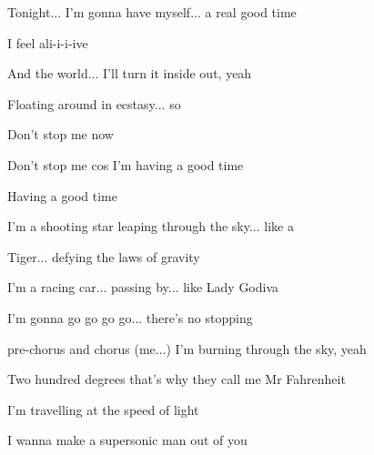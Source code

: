 \begin{song}



\large

\begin{chordbox}
\par
{}\par
{}\par
{}\par
{}\par
{}\par
{}\par
\end{chordbox}

\large

\bigskip

Tonight... I’m gonna have myself... a real good time \par
I feel ali-i-i-ive \par
And the world... I’ll turn it inside out, yeah \par
{}Floating around in ecstasy... so \par
{}Don’t stop me now \par
{}Don’t stop me cos I’m having a good time \par
{}Having a good time \par

\bigskip

I’m a shooting star leaping through the sky... like a \par
Tiger... defying the laws of gravity \par
I’m a racing car... passing by... like Lady Godiva \par
I’m gonna go go go go... there’s no stopping \par

\bigskip

\begin{chorusbox}{pre-chorus and chorus}
(me...) I’m burning through the sky, yeah \par
Two hundred degrees that’s why they call me Mr Fahrenheit \par
I’m travelling at the speed of light \par
I wanna make a supersonic man out of you


\end{chorusbox}
\end{song}
